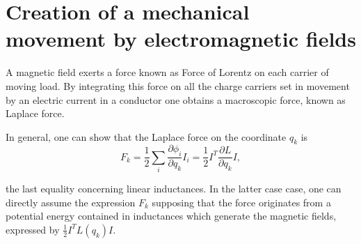 \section{Creation of a mechanical movement by electromagnetic fields} 

A magnetic field exerts a force known as Force of Lorentz on each carrier of moving load. By integrating this force on all the charge carriers set in movement by an electric current in a conductor one obtains a macroscopic force, known as Laplace force.




In general, one can show that the Laplace force on the coordinate $q_k$ is
\begin{equation}
F_k=\frac{1}{2}\sum_i \frac{\partial \phi_i}{\partial q_k}  I_i = \frac{1}{2} I^T \frac{\partial L}{\partial q_k} I,
\label{eq:Lorentz}
\end{equation}

the last equality concerning linear inductances.  In the latter case case, one can directly assume the expression $F_k$ supposing that the force originates from a potential energy contained in inductances which generate the magnetic fields,
expressed by $\frac{1}{2} I^T L(q_k) I$.




